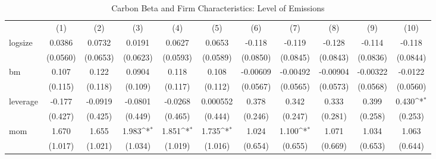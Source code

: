 \begin{table}[htbp]\centering
\def\sym#1{\ifmmode^{#1}\else\(^{#1}\)\fi}
\caption{Carbon Beta and Firm Characteristics: Level of Emissions}
\begin{tabular}{l*{10}{c}}
                &\multicolumn{1}{c}{(1)}         &\multicolumn{1}{c}{(2)}         &\multicolumn{1}{c}{(3)}         &\multicolumn{1}{c}{(4)}         &\multicolumn{1}{c}{(5)}         &\multicolumn{1}{c}{(6)}         &\multicolumn{1}{c}{(7)}         &\multicolumn{1}{c}{(8)}         &\multicolumn{1}{c}{(9)}         &\multicolumn{1}{c}{(10)}         \\
logsize         &   0.0386         &   0.0732         &   0.0191         &   0.0627         &   0.0653         &   -0.118         &   -0.119         &   -0.128         &   -0.114         &   -0.118         \\
                & (0.0560)         & (0.0653)         & (0.0623)         & (0.0593)         & (0.0589)         & (0.0850)         & (0.0845)         & (0.0843)         & (0.0836)         & (0.0844)         \\
bm              &    0.107         &    0.122         &   0.0904         &    0.118         &    0.108         & -0.00609         & -0.00492         & -0.00904         & -0.00322         &  -0.0122         \\
                &  (0.115)         &  (0.118)         &  (0.109)         &  (0.117)         &  (0.112)         & (0.0567)         & (0.0565)         & (0.0573)         & (0.0568)         & (0.0560)         \\
leverage        &   -0.177         &  -0.0919         &  -0.0801         &  -0.0268         & 0.000552         &    0.378         &    0.342         &    0.333         &    0.399         &    0.430\sym{*}  \\
                &  (0.427)         &  (0.425)         &  (0.449)         &  (0.465)         &  (0.444)         &  (0.246)         &  (0.247)         &  (0.281)         &  (0.258)         &  (0.253)         \\
mom             &    1.670         &    1.655         &    1.983\sym{*}  &    1.851\sym{*}  &    1.735\sym{*}  &    1.024         &    1.100\sym{*}  &    1.071         &    1.034         &    1.063         \\
                &  (1.017)         &  (1.021)         &  (1.034)         &  (1.019)         &  (1.016)         &  (0.654)         &  (0.655)         &  (0.669)         &  (0.653)         &  (0.644)         \\

\end{tabular}
\end{table}
